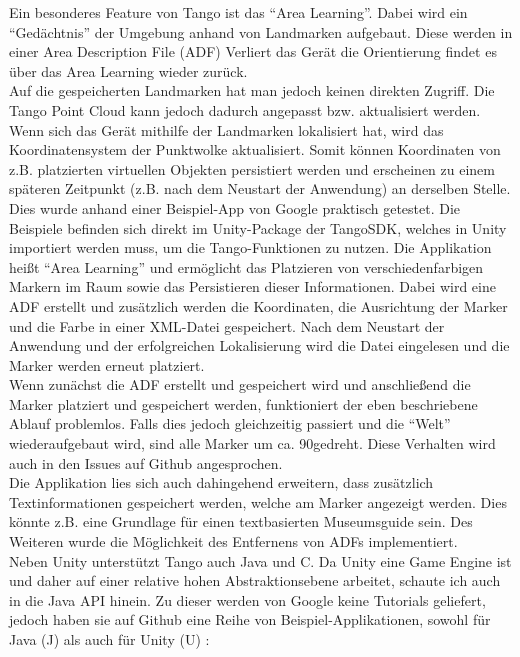 Ein besonderes Feature von Tango ist das "`Area Learning"'. Dabei wird ein "`Gedächtnis"' der Umgebung anhand von Landmarken aufgebaut. Diese werden in einer Area Description File (ADF) Verliert das Gerät die Orientierung findet es über das Area Learning wieder zurück.\cite{fehling}\\
Auf die gespeicherten Landmarken hat man jedoch keinen direkten Zugriff. Die Tango Point Cloud kann jedoch dadurch angepasst bzw. aktualisiert werden. Wenn sich das Gerät mithilfe der Landmarken lokalisiert hat, wird das Koordinatensystem der Punktwolke aktualisiert. Somit können Koordinaten von z.B. platzierten virtuellen Objekten persistiert werden und erscheinen zu einem späteren Zeitpunkt (z.B. nach dem Neustart der Anwendung) an derselben Stelle.\\
Dies wurde anhand einer Beispiel-App von Google praktisch getestet. Die Beispiele befinden sich direkt im Unity-Package der TangoSDK, welches in Unity importiert werden muss, um die Tango-Funktionen zu nutzen. Die Applikation heißt "`Area Learning"' und ermöglicht das Platzieren von verschiedenfarbigen Markern im Raum sowie das Persistieren dieser Informationen. Dabei wird eine ADF erstellt und zusätzlich werden die Koordinaten, die Ausrichtung der Marker und die Farbe in einer XML-Datei gespeichert. Nach dem Neustart der Anwendung und der erfolgreichen Lokalisierung wird die Datei eingelesen und die Marker werden erneut platziert.\\
Wenn zunächst die ADF erstellt und gespeichert wird und anschließend die Marker platziert und gespeichert werden, funktioniert der eben beschriebene Ablauf problemlos. Falls dies jedoch gleichzeitig passiert und die "`Welt"' wiederaufgebaut wird, sind alle Marker um ca. 90\degree gedreht. Diese Verhalten wird auch in den Issues auf Github angesprochen\cite{tango_unity_github_issue100}.\\
Die Applikation lies sich auch dahingehend erweitern, dass zusätzlich Textinformationen gespeichert werden, welche am Marker angezeigt werden. Dies könnte z.B. eine Grundlage für einen textbasierten Museumsguide sein. Des Weiteren wurde die Möglichkeit des Entfernens von ADFs implementiert.\\
Neben Unity unterstützt Tango auch Java und C. Da Unity eine Game Engine ist und daher auf einer relative hohen Abstraktionsebene arbeitet, schaute ich auch in die Java API hinein. Zu dieser werden von Google keine Tutorials geliefert, jedoch haben sie auf Github eine Reihe von Beispiel-Applikationen, sowohl für Java (J)  \cite{tango_java_github} als auch für Unity (U) \cite{tango_unity_github}:
